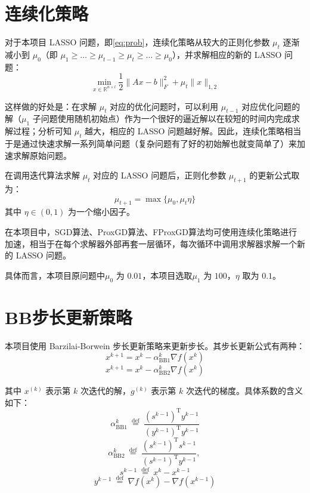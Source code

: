 \documentclass[journal, a4paper]{IEEEtran}
\begin{document}
\section{\textbf{连续化策略}}

对于本项目 LASSO 问题，即\ref{eq:prob}，连续化策略从较大的正则化参数 $\mu_t$ 逐渐减小到 $\mu_0$（即 $\mu_1 \geq \ldots \geq \mu_{t-1} \geq \mu_t \geq \ldots \geq \mu_0$），并求解相应的新的 LASSO 问题：
\begin{equation}\label{eq:prob-mut}
    \min _{x \in \mathbb{R}^{n \times l}} \frac{1}{2}\|A x-b\|_F^2+\mu_{t}\|x\|_{1,2}
\end{equation}

这样做的好处是：在求解 $\mu_t$ 对应的优化问题时，可以利用 $\mu_{t-1}$ 对应优化问题的解（$\mu_1$ 子问题使用随机初始点）作为一个很好的逼近解以在较短的时间内完成求解过程；分析可知 $\mu_t$ 越大，相应的 LASSO 问题越好解\cite{LASSO_con}。因此，连续化策略相当于是通过快速求解一系列简单问题（复杂问题有了好的初始解也就变简单了）来加速求解原始问题。

在调用迭代算法求解 $\mu_t$ 对应的 LASSO 问题后，正则化参数 $\mu_{t+1}$ 的更新公式取为：
$$
\mu_{t+1} = \max\{\mu_0, \mu_t \eta\}
$$
其中 $\eta \in (0,1)$ 为一个缩小因子。

在本项目中，SGD算法、ProxGD算法、FProxGD算法均可使用连续化策略进行加速，相当于在每个求解器外部再套一层循环，每次循环中调用求解器求解一个新的 LASSO 问题。

具体而言，本项目原问题中$\mu_0$ 为 $0.01$，本项目选取$\mu_1$ 为 $100$，$\eta$ 取为 $0.1$。

\section{\textbf{BB步长更新策略}}

本项目使用 Barzilai-Borwein 步长更新策略来更新步长。其步长更新公式有两种：
\begin{equation}
x^{k+1}=x^k-\alpha_{\mathrm{BB} 1}^k \nabla f\left(x^k\right)\label{eq:BB1}
\end{equation}
\begin{equation}
x^{k+1}=x^k-\alpha_{\mathrm{BB} 2}^k \nabla f\left(x^k\right) \label{eq:BB2}
\end{equation}

其中 $x^{(k)}$ 表示第 $k$ 次迭代的解，$g^{(k)}$ 表示第 $k$ 次迭代的梯度。具体系数的含义如下：
$$
\alpha_{\mathrm{BB} 1}^k \stackrel{\text { def }}{=} \frac{\left(s^{k-1}\right)^{\mathrm{T}} y^{k-1}}{\left(y^{k-1}\right)^{\mathrm{T}} y^{k-1}} 
$$
$$
\alpha_{\mathrm{BB} 2}^k \stackrel{\text { def }}{=} \frac{\left(s^{k-1}\right)^{\mathrm{T}} s^{k-1}}{\left(s^{k-1}\right)^{\mathrm{T}} y^{k-1}} \text {, }
$$
$$
s^{k-1} \stackrel{\text { def }}{=} x^k-x^{k-1}
$$ 
$$y^{k-1} \stackrel{\text { def }}{=} \nabla f\left(x^k\right)-\nabla f\left(x^{k-1}\right)
$$
\end{document}
